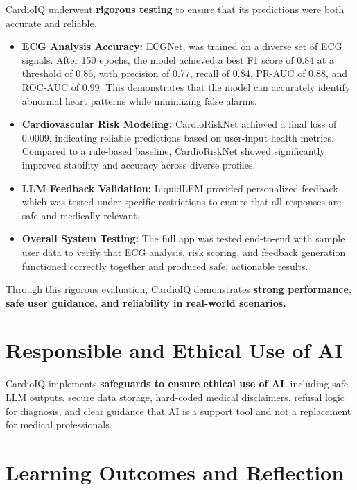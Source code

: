 \documentclass[12pt]{article}
\begin{document}
CardioIQ underwent \textbf{rigorous testing} to ensure that its predictions were both accurate and reliable.  

\begin{itemize}[leftmargin=1.5em]
    \item \textbf{ECG Analysis Accuracy:} ECGNet, was trained on a diverse set of ECG signals. After 150 epochs, the model achieved a best F1 score of 0.84 at a threshold of 0.86, with precision of 0.77, recall of 0.84, PR-AUC of 0.88, and ROC-AUC of 0.99. This demonstrates that the model can accurately identify abnormal heart patterns while minimizing false alarms.
    \item \textbf{Cardiovascular Risk Modeling:} CardioRiskNet achieved a final loss of 0.0009, indicating reliable predictions based on user-input health metrics. Compared to a rule-based baseline, CardioRiskNet showed significantly improved stability and accuracy across diverse profiles.
    \item \textbf{LLM Feedback Validation:} LiquidLFM provided personalized feedback which was tested under specific restrictions to ensure that all responses are safe and medically relevant. 
    \item \textbf{Overall System Testing:} The full app was tested end-to-end with sample user data to verify that ECG analysis, risk scoring, and feedback generation functioned correctly together and produced safe, actionable results.
\end{itemize}

Through this rigorous evaluation, CardioIQ demonstrates \textbf{strong performance, safe user guidance, and reliability in real-world scenarios.}

\section*{Responsible and Ethical Use of AI}

CardioIQ implements \textbf{safeguards to ensure ethical use of AI}, including safe LLM outputs, secure data storage, hard-coded medical disclaimers, refusal logic for diagnosis, and clear guidance that AI is a support tool and not a replacement for medical professionals. 


\section*{Learning Outcomes and Reflection}
\end{document}
